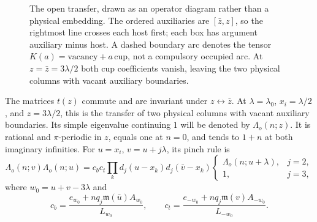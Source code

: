 \begin{figure}[!hbp]
\centering
{}
\caption{The open transfer, drawn as an operator diagram rather than a
physical embedding. The ordered auxiliaries are \([\bar z,z]\), so the
rightmost line crosses each host first; each box has argument auxiliary
minus host. A dashed boundary arc denotes the tensor
\(K(a)=\text{vacancy}+a\,\text{cup}\), not a compulsory occupied arc.
At \(z=\bar z=3\lambda/2\) both cup coefficients vanish, leaving the
two physical columns with vacant auxiliary boundaries.}
\label{fig:05-open-transfer}
\end{figure}


\begin{lemma}
\label{lem:05-open-pinch}
The matrices \(t(z)\) commute and are invariant under \(z\leftrightarrow\bar z\). At \(\lambda=\lambda_0\), \(x_i=\lambda/2\), and \(z=3\lambda/2\), this is the transfer of two physical columns with vacant auxiliary boundaries. Its simple eigenvalue continuing \(1\) will be denoted by \(\Lambda_o(n;z)\). It is rational and \(\pi\)-periodic in \(z\), equals one at \(n=0\), and tends to \(1+n\) at both imaginary infinities. For \(u=x_i\), \(v=u+j\lambda\), its pinch rule is
\begin{equation}
 \Lambda_o(n;v)\Lambda_o(n;u)
 =c_bc_t\prod_kd_j(u-x_k)d_j(\bar v-x_k)
 \begin{cases}
 \Lambda_o(n;u+\lambda),&j=2,\\
 1,&j=3,
 \end{cases}
 \label{eq:05-open-pinch}
\end{equation}
where \(w_0=u+v-3\lambda\) and
\begin{equation}
 c_b=\frac{e_{w_0}+nq_j\mathfrak m(\bar u)A_{w_0}}{L_{w_0}},
 \qquad
 c_t=\frac{e_{-w_0}+nq_j\mathfrak m(v)A_{-w_0}}{L_{-w_0}}.
 \label{eq:05-boundary-scalars}
\end{equation}
\end{lemma}

